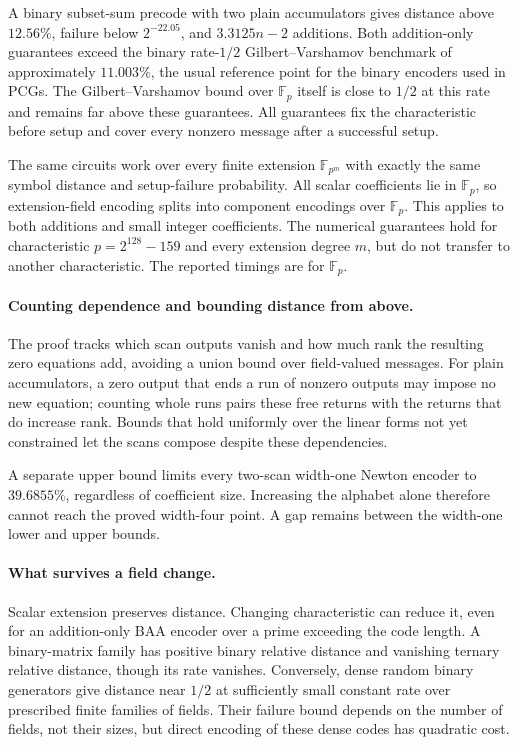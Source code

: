 \documentclass[runningheads,envcountsame,envcountsect]{llncs}
\newcommand{\F}{\mathbb F}
\begin{document}
A binary subset-sum precode with two plain accumulators gives distance
above $12.56\%$, failure below $2^{-22.05}$, and $3.3125n-2$ additions.
Both addition-only guarantees exceed the binary rate-$1/2$
Gilbert--Varshamov benchmark of approximately $11.003\%$, the usual
reference point for the binary encoders used in PCGs. The
Gilbert--Varshamov bound over $\F_p$ itself is close to $1/2$ at this
rate and remains far above these guarantees. All guarantees fix the
characteristic before setup and cover every nonzero message after a
successful setup.

The same circuits work over every finite extension $\F_{p^m}$ with
exactly the same symbol distance and setup-failure probability. All scalar
coefficients lie in $\F_p$, so extension-field encoding splits into
component encodings over $\F_p$. This applies to both additions and small
integer coefficients. The numerical guarantees hold for characteristic
$p=2^{128}-159$ and every extension degree $m$, but do not transfer to
another characteristic. The reported timings are for $\F_p$.

\paragraph{Counting dependence and bounding distance from above.}
The proof tracks which scan outputs vanish and how much rank the
resulting zero equations add, avoiding a union bound over field-valued
messages. For plain accumulators, a zero output that ends a run of
nonzero outputs may impose no new equation; counting whole runs pairs
these free returns with the returns that do increase rank. Bounds that
hold uniformly over the linear forms not yet constrained let the scans
compose despite these dependencies.

A separate upper bound limits every two-scan width-one Newton encoder
to $39.6855\%$, regardless of coefficient size. Increasing the alphabet
alone therefore cannot reach the proved width-four point. A gap remains
between the width-one lower and upper bounds.

\paragraph{What survives a field change.}
Scalar extension preserves distance. Changing characteristic can reduce
it, even for an addition-only BAA encoder over a prime exceeding the code
length. A binary-matrix family has positive binary relative distance and
vanishing ternary relative distance, though its rate vanishes. Conversely,
dense random binary generators give distance near $1/2$ at sufficiently
small constant rate over prescribed finite families of fields. Their
failure bound depends on the number of fields, not their sizes, but
direct encoding of these dense codes has quadratic cost.
\end{document}
